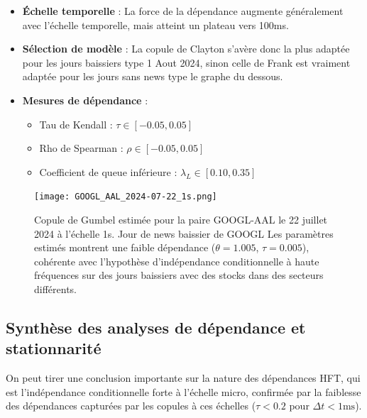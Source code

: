 \documentclass[10pt,a4paper]{article}
\theoremstyle{definition}
\theoremstyle{remark}
\begin{document}
    \begin{itemize}
    \item \textbf{Échelle temporelle} : La force de la dépendance augmente généralement avec l'échelle temporelle, mais atteint un plateau vers 100ms.
    
    \item \textbf{Sélection de modèle} : La copule de Clayton s'avère donc la plus adaptée pour les jours baissiers type 1 Aout 2024, sinon celle de Frank est vraiment adaptée pour les jours sans news type le graphe du dessous.
    
    \item \textbf{Mesures de dépendance} :
    \begin{itemize}
        \item Tau de Kendall : $\tau \in [-0.05, 0.05]$
        \item Rho de Spearman : $\rho \in [-0.05, 0.05]$
        \item Coefficient de queue inférieure : $\lambda_L \in [0.10, 0.35]$
    \end{itemize}
    \end{itemize}
    
\begin{figure}[h!]
\centering
    \texttt{[image: GOOGL\_AAL\_2024-07-22\_1s.png]}
    \caption{Copule de Gumbel estimée pour la paire GOOGL-AAL le 22 juillet 2024 à l'échelle 1s. Jour de news baissier de GOOGL Les paramètres estimés montrent une faible dépendance ($\theta = 1.005$, $\tau = 0.005$), cohérente avec l'hypothèse d'indépendance conditionnelle à haute fréquences sur des jours baissiers avec des stocks dans des secteurs différents.}
    \label{fig:copula_example_app1}
\end{figure}




\subsection{Synthèse des analyses de dépendance et stationnarité}

On peut tirer une conclusion importante sur la nature des dépendances HFT, qui est l'indépendance conditionnelle forte à l'échelle micro, confirmée par la faiblesse des dépendances capturées par les copules à ces échelles ($\tau < 0.2$ pour $\Delta t < 1\text{ms}$).
    
\end{document}
